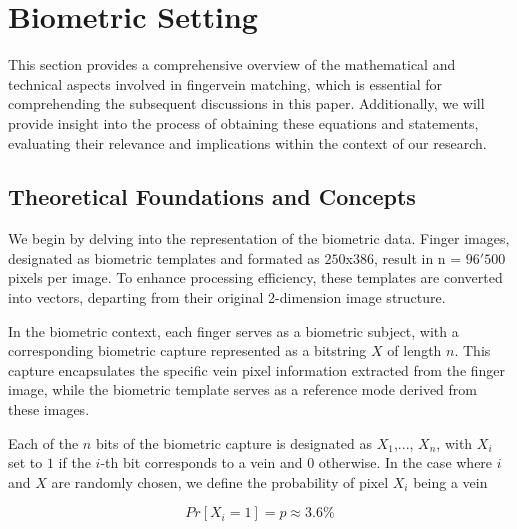 \section{Biometric Setting}

This section provides a comprehensive overview of the mathematical and technical aspects involved in fingervein matching, which is essential for comprehending the subsequent discussions in this paper. Additionally, we will provide insight into the process of obtaining these equations and statements, evaluating their relevance and implications within the context of our research. 


\subsection{Theoretical Foundations and Concepts}

We begin by delving into the representation of the biometric data. Finger images, designated as biometric templates and formated as \(250\)x\(386\), result in n = \(96'500\) pixels per image. To enhance processing efficiency, these templates are converted into vectors, departing from their original 2-dimension image structure. 

In the biometric context, each finger serves as a biometric subject, with a corresponding biometric capture represented as a bitstring \(X\) of length \(n\). This capture encapsulates the specific vein pixel information extracted from the finger image, while the biometric template serves as a reference mode derived from these images. 

Each of the \(n\) bits of the biometric capture is designated as \(X_1\),..., \(X_n\), with \(X_i\) set to \(1\) if the \(i\)-th bit corresponds to a vein and \(0\) otherwise. In the case where \(i\) and \(X\) are randomly chosen, we define the probability of pixel \(X_i\) being a vein 

\begin{equation} \label{eq:p}
    Pr[X_i = 1] = p \approx 3.6 \% 
\end{equation}

